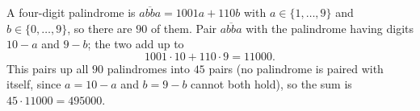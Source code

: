 A four-digit palindrome is $\overline{abba}=1001a+110b$ with $a\in\{1,\dots,9\}$ and $b\in\{0,\dots,9\}$, so there are $90$ of them. Pair $\overline{abba}$ with the palindrome having digits $10-a$ and $9-b$; the two add up to
\[1001\cdot10+110\cdot9=11000.\]
This pairs up all $90$ palindromes into $45$ pairs (no palindrome is paired with itself, since $a=10-a$ and $b=9-b$ cannot both hold), so the sum is $45\cdot11000=\boxed{495000}$.
